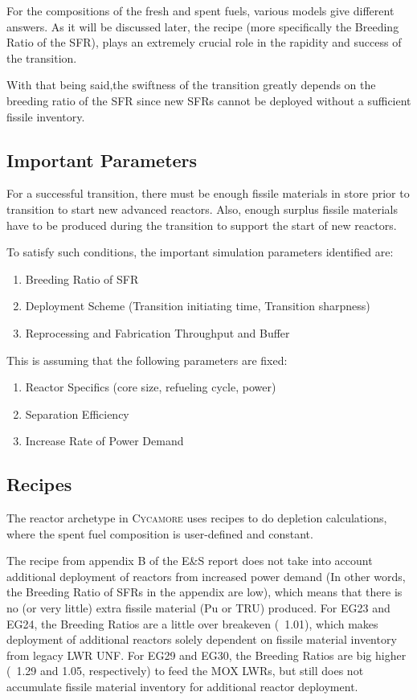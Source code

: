 \documentclass{article}
\newcommand{\Cycamore}{\textsc{Cycamore}\xspace}%
\begin{document}
For the compositions of the fresh and spent fuels, various models give different answers.
As it will be discussed later, the recipe (more specifically the Breeding Ratio of the \gls{SFR}),
plays an extremely crucial role in the rapidity and success of the transition. 

With that being said,the swiftness of the transition greatly depends on the 
breeding ratio of the \gls{SFR} since new \glspl{SFR} cannot be deployed 
without a sufficient fissile inventory. 

\subsection{Important Parameters}
For a successful transition, there must be enough fissile materials in store prior to transition
to start new advanced reactors. Also, enough surplus fissile materials have to be produced
during the transition to support the start of new reactors.

To satisfy such conditions, the important simulation parameters identified are:
\begin{enumerate}
	\item Breeding Ratio of \gls{SFR}
	\item Deployment Scheme (Transition initiating time, Transition sharpness)
	\item Reprocessing and Fabrication Throughput and Buffer
\end{enumerate}


This is assuming that the following parameters are fixed:
\begin{enumerate}
	\item Reactor Specifics (core size, refueling cycle, power)
	\item Separation Efficiency
	\item Increase Rate of Power Demand
\end{enumerate}

\subsection{Recipes}
The reactor archetype in \Cycamore uses recipes to do depletion calculations,
where the spent fuel composition is user-defined and constant. 

The recipe from appendix B of the E\&S report does not take into account
additional deployment of reactors from increased power demand (In other words, the Breeding Ratio
of \glspl{SFR} in the appendix are low), which means that there is no (or very little)
extra fissile material (Pu or TRU) produced. For EG23 and EG24, the Breeding Ratios are
a little over breakeven (~1.01), which makes deployment of additional reactors solely 
dependent on fissile material inventory from legacy LWR \gls{UNF}. For EG29 and EG30,
the Breeding Ratios are big higher (~1.29 and 1.05, respectively) to feed the
\gls{MOX} \glspl{LWR}, but still does not accumulate fissile material inventory for
additional reactor deployment.
\end{document}
